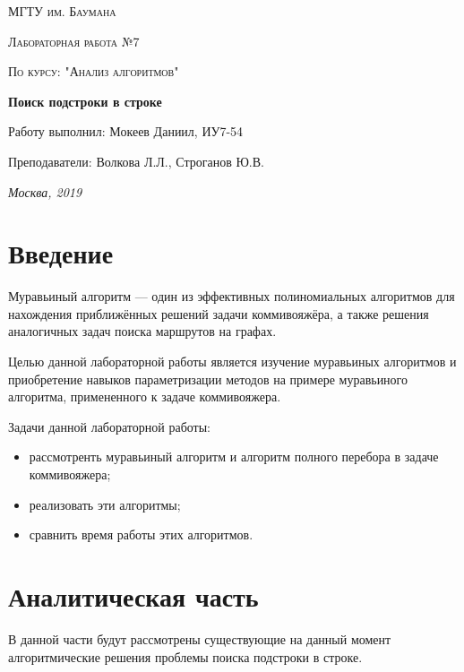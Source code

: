 \documentclass[12pt]{report}
\begin{document}
\begin{titlepage}
	\centering
	{\scshape\LARGE МГТУ им. Баумана \par}
	\vspace{3cm}
	{\scshape\Large Лабораторная работа №7\par}
	\vspace{0.5cm}	
	{\scshape\Large По курсу: "Анализ алгоритмов"\par}
	\vspace{1.5cm}
	{\huge\bfseries Поиск подстроки в строке\par}
	\vspace{2cm}
	\Large Работу выполнил: Мокеев Даниил, ИУ7-54\par
	\vspace{0.5cm}
	\Large Преподаватели:  Волкова Л.Л., Строганов Ю.В.\par

	\vfill
	\large \textit {Москва, 2019} \par
\end{titlepage}

\tableofcontents

\newpage
\chapter*{Введение}

Муравьиный алгоритм — один из эффективных полиномиальных алгоритмов для нахождения приближённых решений задачи коммивояжёра, а также решения аналогичных задач поиска маршрутов на графах.

Целью данной лабораторной работы является изучение муравьиных алгоритмов и приобретение навыков параметризации методов на примере муравьиного алгоритма, примененного к задаче коммивояжера.

Задачи данной лабораторной работы:
\begin{itemize}
	\item рассмотренть муравьиный алгоритм и алгоритм полного перебора в задаче коммивояжера;
	\item реализовать эти алгоритмы;
	\item сравнить время работы этих алгоритмов.
\end{itemize}


\chapter{Аналитическая часть}
В данной части будут рассмотрены существующие на данный момент алгоритмические решения проблемы поиска подстроки в строке. 
\end{document}
